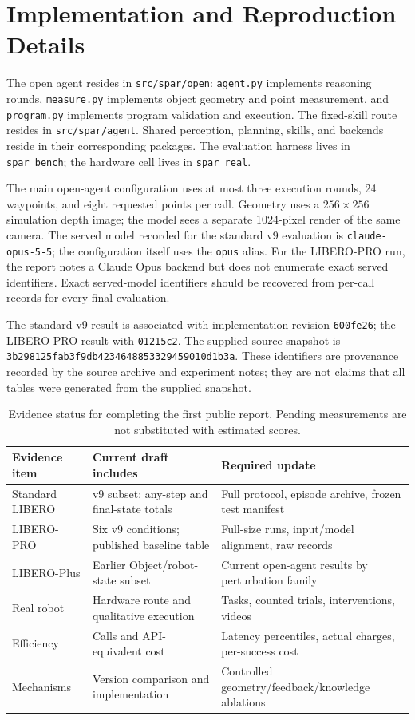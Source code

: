 \section{Implementation and Reproduction Details}

The open agent resides in \texttt{src/spar/open}: \texttt{agent.py} implements reasoning rounds, \texttt{measure.py} implements object geometry and point measurement, and \texttt{program.py} implements program validation and execution. The fixed-skill route resides in \texttt{src/spar/agent}. Shared perception, planning, skills, and backends reside in their corresponding packages. The evaluation harness lives in \texttt{spar\_bench}; the hardware cell lives in \texttt{spar\_real}.

The main open-agent configuration uses at most three execution rounds, 24 waypoints, and eight requested points per call. Geometry uses a $256\times256$ simulation depth image; the model sees a separate 1024-pixel render of the same camera. The served model recorded for the standard v9 evaluation is \texttt{claude-opus-5-5}; the configuration itself uses the \texttt{opus} alias. For the LIBERO-PRO run, the report notes a Claude Opus backend but does not enumerate exact served identifiers. Exact served-model identifiers should be recovered from per-call records for every final evaluation.

The standard v9 result is associated with implementation revision \texttt{600fe26}; the LIBERO-PRO result with \texttt{01215c2}. The supplied source snapshot is \texttt{3b298125fab3f9db4234648853329459010d1b3a}. These identifiers are provenance recorded by the source archive and experiment notes; they are not claims that all tables were generated from the supplied snapshot.

\begin{table}[h]
\centering\small
\begin{tabularx}{\linewidth}{@{}lXX@{}}
\toprule
Evidence item & Current draft includes & Required update \\
\midrule
Standard LIBERO & v9 subset; any-step and final-state totals & Full protocol, episode archive, frozen test manifest \\
LIBERO-PRO & Six v9 conditions; published baseline table & Full-size runs, input/model alignment, raw records \\
LIBERO-Plus & Earlier Object/robot-state subset & Current open-agent results by perturbation family \\
Real robot & Hardware route and qualitative execution & Tasks, counted trials, interventions, videos \\
Efficiency & Calls and API-equivalent cost & Latency percentiles, actual charges, per-success cost \\
Mechanisms & Version comparison and implementation & Controlled geometry/feedback/knowledge ablations \\
\bottomrule
\end{tabularx}
\caption{Evidence status for completing the first public report. Pending measurements are not substituted with estimated scores.}
\end{table}

